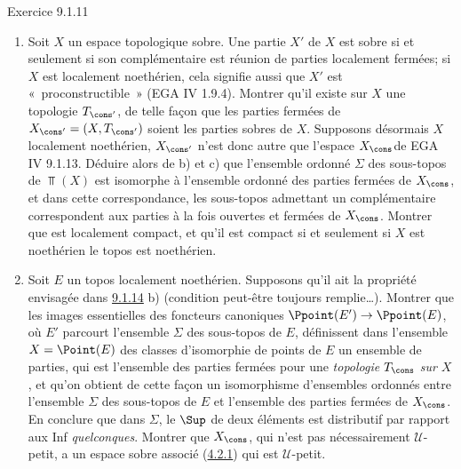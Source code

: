 \begin{enonce*}[remark]{Exercice 9.1.11}
\begin{enumerate}
\item Soit $X$ un espace topologique sobre. Une partie $X'$ de $X$ est
sobre si et seulement si son complémentaire est réunion de parties
localement fermées; si $X$ est localement noethérien, cela signifie
aussi que $X'$ est « proconstructible »  (EGA IV 1.9.4). Montrer
qu'il existe sur $X$ une topologie $T_{\cons'}$, de telle façon
que les parties fermées de $X_{\cons'}=(X,T_{\cons'})$ soient les
parties sobres de $X$. Supposons désormais $X$ localement
noethérien, $X_{\cons'}$ n'est donc autre que l'espace
$X_{\cons}$\pageoriginale de EGA IV 9.1.13. Déduire alors de b) et c)
que l'ensemble ordonné $\Sigma$ des sous-topos de $\Top(X)$ est
isomorphe à l'ensemble ordonné des parties fermées de $X_{\cons}$,
et dans cette correspondance, les sous-topos admettant un
complémentaire correspondent aux parties à la fois ouvertes et
fermées de $X_{\cons}$. Montrer que  est localement compact, et
qu'il est compact si et seulement si $X$ est noethérien \ie le topos
 est noethérien.

\item Soit $E$ un topos localement noethérien. Supposons qu'il ait la
propriété envisagée dans \hyperref[IV.subsubsec9.1.14]{9.1.14} b) (condition
peut-être toujours remplie\ldots). Montrer que les images
essentielles des foncteurs canoniques $\Ppoint(E')\rightarrow
\Ppoint(E)$, où $E'$ parcourt l'ensemble $\Sigma$ des sous-topos de
$E$, définissent dans l'ensemble $X=\Point(E)$ des classes
d'isomorphie de points de $E$ un ensemble de parties, qui est
l'ensemble des parties fermées pour une \emph{topologie} $T_{\cons}$
\emph{sur} $X$, et qu'on obtient de cette façon un isomorphisme
d'ensembles ordonnés entre l'ensemble $\Sigma$ des sous-topos de $E$
et l'ensemble des parties fermées de $X_{\cons}$. En conclure que
dans $\Sigma$, le $\Sup$ de deux éléments est distributif par
rapport aux Inf \emph{quelconques}. Montrer que $X_{\cons}$, qui
n'est pas nécessairement $𝒰$-petit, a un espace sobre
associé (\hyperref[IV.subsubsec4.2.1]{4.2.1}) qui est $𝒰$-petit.
\end{enumerate}
\end{enonce*}

